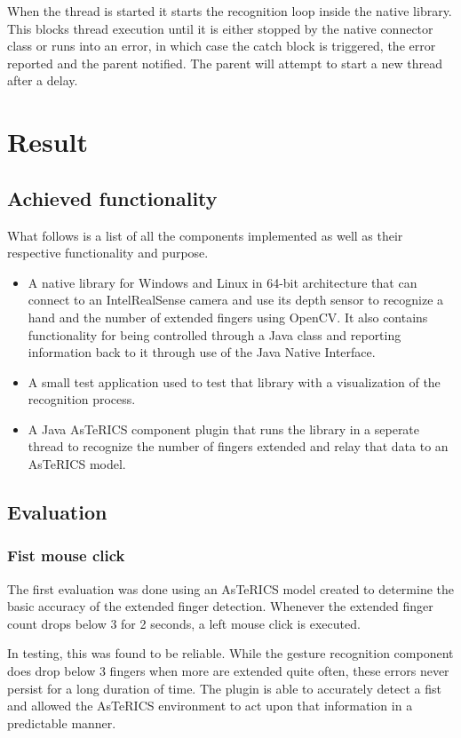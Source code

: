 \documentclass[BSA,Bachelor,english]{twbook}%
\begin{document}
When the thread is started it starts the recognition loop inside the native library. This blocks thread execution until it is either stopped by the native connector class or runs into an error, in which case the catch block is triggered, the error reported and the parent notified. The parent will attempt to start a new thread after a delay.
\newpage
\chapter{Result}
\section{Achieved functionality}

What follows is a list of all the components implemented as well as their respective functionality and purpose.

\begin{itemize}
	\item A native library for Windows and Linux in 64-bit architecture that can connect to an IntelRealSense camera and use its depth sensor to recognize a hand and the number of extended fingers using OpenCV. It also contains functionality for being controlled through a Java class and reporting information back to it through use of the Java Native Interface.
	\item A small test application used to test that library with a visualization of the recognition process.
	\item A Java AsTeRICS component plugin that runs the library in a seperate thread to recognize the number of fingers extended and relay that data to an AsTeRICS model.
\end{itemize}



\section{Evaluation}

\subsection{Fist mouse click}

The first evaluation was done using an AsTeRICS model created to determine the basic accuracy of the extended finger detection. Whenever the extended finger count drops below 3 for 2 seconds, a left mouse click is executed.

In testing, this was found to be reliable. While the gesture recognition component does drop below 3 fingers when more are extended quite often, these errors never persist for a long duration of time. The plugin is able to accurately detect a fist and allowed the AsTeRICS environment to act upon that information in a predictable manner.
\end{document}
